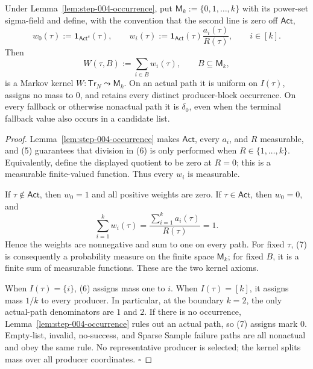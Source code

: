\begin{lemma}\label{lem:step-004-mark-kernel}
Under Lemma~\ref{lem:step-004-occurrence}, put
\(\mathsf M_k:=\{0,1,\ldots,k\}\) with its power-set sigma-field and define,
with the convention that the second line is zero off \(\mathsf{Act}\),
\[
w_0(\tau):=\mathbf1_{\mathsf{Act}^c}(\tau),
\qquad
w_i(\tau):=
\mathbf1_{\mathsf{Act}}(\tau)
\frac{a_i(\tau)}{R(\tau)},\qquad i\in[k].
\tag{6}
\]
Then
\[
W(\tau,B):=\sum_{i\in B}w_i(\tau),
\qquad B\subseteq\mathsf M_k,
\tag{7}
\]
is a Markov kernel
\(W:\mathsf{Tr}_N\leadsto\mathsf M_k\). On an actual path it is uniform
on \(I(\tau)\), assigns no mass to \(0\), and retains every distinct
producer-block occurrence. On every fallback or otherwise nonactual path it
is \(\delta_0\), even when the terminal fallback value also occurs in a
candidate list.


\end{lemma}

\begin{proof}
Lemma~\ref{lem:step-004-occurrence} makes
\(\mathsf{Act}\), every \(a_i\), and \(R\) measurable, and (5) guarantees
that division in (6) is only performed when \(R\in\{1,\ldots,k\}\).
Equivalently, define the displayed quotient to be zero at \(R=0\); this is
a measurable finite-valued function. Thus every \(w_i\) is measurable.

If \(\tau\notin\mathsf{Act}\), then \(w_0=1\) and all positive weights are
zero. If \(\tau\in\mathsf{Act}\), then \(w_0=0\), and
\[
\sum_{i=1}^k w_i(\tau)
=\frac{\sum_{i=1}^k a_i(\tau)}{R(\tau)}=1.
\tag{8}
\]
Hence the weights are nonnegative and sum to one on every path. For fixed
\(\tau\), (7) is consequently a probability measure on the finite space
\(\mathsf M_k\); for fixed \(B\), it is a finite sum of measurable
functions. These are the two kernel axioms.

When \(I(\tau)=\{i\}\), (6) assigns mass one to \(i\). When
\(I(\tau)=[k]\), it assigns mass \(1/k\) to every producer. In particular,
at the boundary \(k=2\), the only actual-path denominators are \(1\) and
\(2\). If there is no occurrence, Lemma~\ref{lem:step-004-occurrence}
rules out an actual path, so (7) assigns mark \(0\). Empty-list, invalid,
no-success, and Sparse Sample failure paths are all nonactual and obey the
same rule. No representative producer is selected; the kernel splits mass
over all producer coordinates. \(\square\)


\end{proof}

